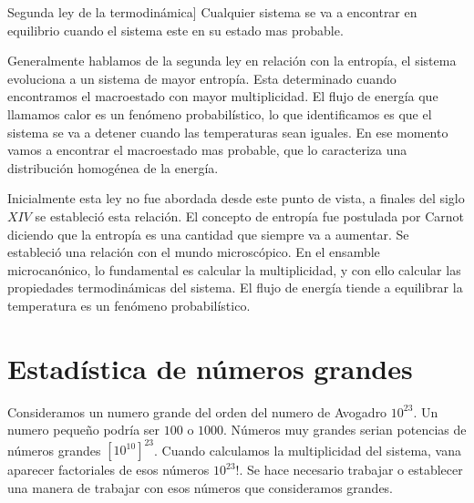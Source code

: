 \documentclass[11pt,fleqn]{book}
\begin{document}
\begin{definition}[]Segunda ley de la termodinámica]
Cualquier sistema se va a encontrar en equilibrio cuando el sistema este en su estado mas probable.

Generalmente hablamos de la segunda ley en relación con la entropía, el sistema evoluciona a un sistema de mayor entropía. Esta determinado cuando encontramos el macroestado con mayor multiplicidad. El flujo de energía que llamamos calor es un fenómeno probabilístico, lo que identificamos es que el sistema se va a detener cuando las temperaturas sean iguales. En ese momento vamos a encontrar el macroestado mas probable, que lo caracteriza una distribución homogénea de la energía.
\end{definition}

Inicialmente esta ley no fue abordada desde este punto de vista, a finales del siglo $XIV$ se estableció esta relación. El concepto de entropía fue postulada por Carnot diciendo que la entropía es una cantidad que siempre va a aumentar. Se estableció una relación con el mundo microscópico. En el ensamble microcanónico, lo fundamental es calcular la multiplicidad, y con ello calcular las propiedades termodinámicas del sistema. El flujo de energía tiende a equilibrar la temperatura es un fenómeno probabilístico. 

\chapter{Estadística de números grandes}

Consideramos un numero grande del orden del numero de Avogadro $10^{23}$. Un numero pequeño podría ser $100$ o $1000$. Números muy grandes serian potencias de números grandes $[10^{10}]^{23}$. Cuando calculamos la multiplicidad del sistema, vana  aparecer factoriales de esos números $10^{23}!$. Se hace necesario trabajar o establecer una manera de trabajar con esos números que consideramos grandes. 
\end{document}
